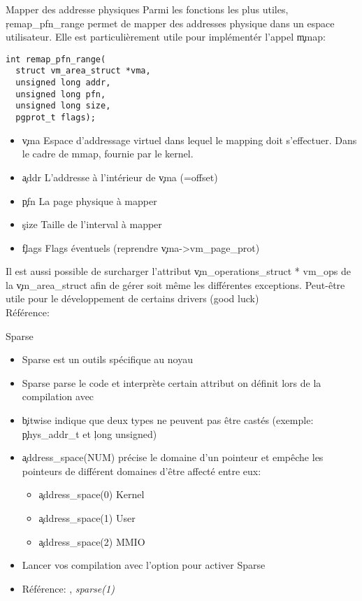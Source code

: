 \begin{frame}[fragile=singleslide]{Mapper des addresse physiques}
  Parmi les  fonctions les plus utiles,  \c{remap_pfn_range} permet de
  mapper des  addresses physique dans un espace  utilisateur. Elle est
  particulièrement utile pour implémentér l'appel \c{mmap}:
  \begin{lstlisting} 
int remap_pfn_range(
  struct vm_area_struct *vma,
  unsigned long addr, 
  unsigned long pfn,  
  unsigned long size, 
  pgprot_t flags);    
  \end{lstlisting} 
  \begin{itemize}
  \item  \c{vma} Espace  d'addressage virtuel  dans lequel  le mapping
    doit s'effectuer. Dans le cadre de mmap, fournie par le kernel.
  \item \c{addr} L'addresse à l'intérieur de \c{vma} (=offset)
  \item \c{pfn} La page physique à mapper     
  \item \c{size} Taille de l'interval à mapper 
  \item \c{flags} Flags éventuels (reprendre \c{vma->vm_page_prot})
  \end{itemize} 

  Il     est    aussi     possible     de    surcharger     l'attribut
  \c{vm_operations_struct *  vm_ops} de la  \c{vm_area_struct} afin de
  gérer soit même les différentes exceptions. Peut-être utile pour le
  développement de certains drivers (good luck) \\[2ex]

  Référence: 
\end{frame} 

\begin{frame}[fragile=singleslide]{Sparse}
  \begin{itemize} 
  \item Sparse est un outils spécifique au noyau
  \item Sparse parse le code et interprète certain attribut on définit
    lors de la compilation avec 
  \item \c{bitwise} indique que deux  types ne peuvent pas être castés
    (exemple: \c{phys_addr_t} et \c{long unsigned})
  \item  \c{address_space(NUM)} précise  le domaine  d'un  pointeur et
    empêche les  pointeurs de différent domaines  d'être affecté entre
    eux:
    \begin{itemize}
    \item \c{address_space(0)} Kernel
    \item \c{address_space(1)} User
    \item \c{address_space(2)} MMIO
    \end{itemize} 
  \item Lancer  vos compilation  avec l'option   pour activer
    Sparse
  \item Référence: , \emph{sparse(1)}
  \end{itemize} 
\end{frame} 

